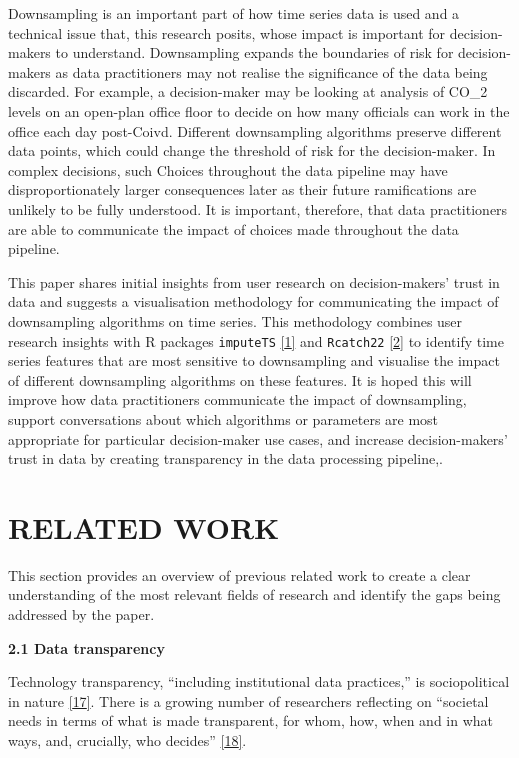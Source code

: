 \documentclass{article}
\begin{document}
Downsampling is an important part of how time series data is used and a
technical issue that, this research posits, whose impact is important
for decision-makers to understand. Downsampling expands the boundaries
of risk for decision-makers as data practitioners may not realise the
significance of the data being discarded. For example, a decision-maker
may be looking at analysis of CO\_2 levels on an open-plan office floor
to decide on how many officials can work in the office each day
post-Coivd. Different downsampling algorithms preserve different data
points, which could change the threshold of risk for the decision-maker.
In complex decisions, such Choices throughout the data pipeline may have
disproportionately larger consequences later as their future
ramifications are unlikely to be fully understood. It is important,
therefore, that data practitioners are able to communicate the impact of
choices made throughout the data pipeline.

This paper shares initial insights from user research on
decision-makers' trust in data and suggests a visualisation methodology
for communicating the impact of downsampling algorithms on time series.
This methodology combines user research insights with R packages
\texttt{imputeTS} \protect\hyperlink{ref-imputeTS_R}{{[}1{]}} and
\texttt{Rcatch22} \protect\hyperlink{ref-catch22_R}{{[}2{]}} to identify
time series features that are most sensitive to downsampling and
visualise the impact of different downsampling algorithms on these
features. It is hoped this will improve how data practitioners
communicate the impact of downsampling, support conversations about
which algorithms or parameters are most appropriate for particular
decision-maker use cases, and increase decision-makers' trust in data by
creating transparency in the data processing pipeline,.

\hypertarget{related-work}{%
\section{RELATED WORK}\label{related-work}}

This section provides an overview of previous related work to create a
clear understanding of the most relevant fields of research and identify
the gaps being addressed by the paper.

\textbf{2.1 Data transparency}

Technology transparency, ``including institutional data practices,'' is
sociopolitical in nature
\protect\hyperlink{ref-political_transparency}{{[}17{]}}. There is a
growing number of researchers reflecting on ``societal needs in terms of
what is made transparent, for whom, how, when and in what ways, and,
crucially, who decides''
\protect\hyperlink{ref-social_transparency}{{[}18{]}}.
\end{document}
